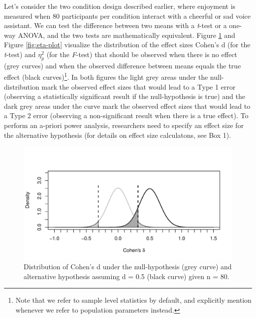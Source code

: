 \documentclass[
  ,jou,floatsintext]{apa6}
\begin{document}
Let's consider the two condition design described earlier, where enjoyment is measured when 80 participants per condition interact with a cheerful or sad voice assistant.
We can test the difference between two means with a \emph{t}-test or a one-way ANOVA, and the two tests are mathematically equivalent.
Figure \ref{fig:d-plot} and Figure \ref{fig:eta-plot} visualize the distribution of the effect sizes Cohen's d (for the \emph{t}-test) and \(\eta_p^2\) (for the \emph{F}-test) that should be observed when there is no effect (grey curves) and when the observed difference between means equals the true effect (black curves)\footnote{Note that we refer to sample level statistics by default, and explicitly mention whenever we refer to population parameters instead.}.
In both figures the light grey areas under the null-distribution mark the observed effect sizes that would lead to a Type 1 error (observing a statistically significant result if the null-hypothesis is true) and the dark grey areas under the curve mark the observed effect sizes that would lead to a Type 2 error (observing a non-significant result when there is a true effect).
To perform an a-priori power analysis, researchers need to specify an effect size for the alternative hypothesis (for details on effect size calculatons, see Box 1).

\begin{figure}
\centering
\includegraphics{0.1_Simulation_Based_Power_Analysis_For_Factorial_ANOVA_Designs_files/figure-latex/d-plot-1.pdf}
\caption{\label{fig:d-plot}Distribution of Cohen's d under the null-hypothesis (grey curve) and alternative hypothesis assuming d = 0.5 (black curve) given n = 80.}
\end{figure}
\end{document}
